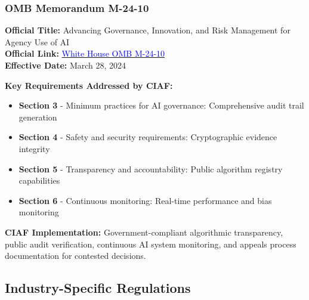 \documentclass[12pt,a4paper]{article}
\begin{document}
\subsubsection{OMB Memorandum M-24-10}
\begin{technicalbox}
\textbf{Official Title:} Advancing Governance, Innovation, and Risk Management for Agency Use of AI\\
\textbf{Official Link:} \href{https://www.whitehouse.gov/wp-content/uploads/2024/03/M-24-10-Advancing-Governance-Innovation-and-Risk-Management-for-Agency-Use-of-Artificial-Intelligence.pdf}{\textcolor{blue}{White House OMB M-24-10}}\\
\textbf{Effective Date:} March 28, 2024

\textbf{Key Requirements Addressed by CIAF:}
\begin{itemize}
\item \textbf{Section 3} - Minimum practices for AI governance: Comprehensive audit trail generation
\item \textbf{Section 4} - Safety and security requirements: Cryptographic evidence integrity
\item \textbf{Section 5} - Transparency and accountability: Public algorithm registry capabilities
\item \textbf{Section 6} - Continuous monitoring: Real-time performance and bias monitoring
\end{itemize}

\textbf{CIAF Implementation:} Government-compliant algorithmic transparency, public audit verification, continuous AI system monitoring, and appeals process documentation for contested decisions.
\end{technicalbox}

\subsection{Industry-Specific Regulations}
\end{document}
